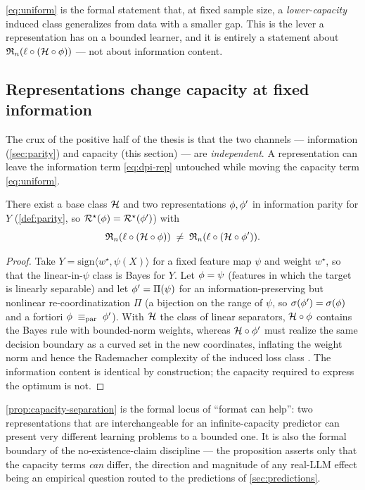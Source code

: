 \eqref{eq:uniform} is the formal statement that, at fixed sample size, a
\emph{lower-capacity} induced class generalizes from data with a smaller gap.
This is the lever a representation has on a bounded learner, and it is
entirely a statement about $\mathfrak{R}_n(\ell\circ(\mathcal{H}\circ\phi))$ --- not about
information content.

\subsection{Representations change capacity at fixed information}
\label{subsec:rep-capacity}

The crux of the positive half of the thesis is that the two channels ---
information (\cref{sec:parity}) and capacity (this section) --- are
\emph{independent}. A representation can leave the information term
\eqref{eq:dpi-rep} untouched while moving the capacity term \eqref{eq:uniform}.

\begin{proposition}
\label{prop:capacity-separation}
There exist a base class $\mathcal{H}$ and two representations $\phi,\phi'$ in
information parity for $Y$ (\cref{def:parity}, so $\mathcal{R}^{\star}(\phi) =
\mathcal{R}^{\star}(\phi')$) with
\[
  \mathfrak{R}_n(\ell\circ(\mathcal{H}\circ\phi))
  \;\ne\;
  \mathfrak{R}_n(\ell\circ(\mathcal{H}\circ\phi')).
\]
\end{proposition}

\begin{proof}
Take $Y=\mathrm{sign}\langle w^\star, \psi(X)\rangle$ for a fixed feature map
$\psi$ and weight $w^\star$, so that the linear-in-$\psi$ class is Bayes for
$Y$. Let $\phi=\psi$ (features in which the target is linearly separable) and
let $\phi'=\Pi(\psi)$ for an information-preserving but nonlinear
re-coordinatization $\Pi$ (a bijection on the range of $\psi$, so
$\sigma\!\left(\phi'\right)=\sigma\!\left(\phi\right)$ and a fortiori $\phi\;\equiv_{\mathrm{par}}\;\phi'$). With
$\mathcal{H}$ the class of linear separators, $\mathcal{H}\circ\phi$ contains the
Bayes rule with bounded-norm weights, whereas $\mathcal{H}\circ\phi'$ must
realize the same decision boundary as a curved set in the new coordinates,
inflating the weight norm and hence the Rademacher complexity of the induced
loss class \citep[Thm.~26.12]{shalevshwartz2014}. The information content is
identical by construction; the capacity required to express the optimum is
not.
\end{proof}

\cref{prop:capacity-separation} is the formal locus of ``format can help'':
two representations that are interchangeable for an infinite-capacity
predictor can present very different learning problems to a bounded one. It is
also the formal boundary of the no-existence-claim discipline --- the proposition asserts only that
the capacity terms \emph{can} differ, the direction and magnitude of any
real-LLM effect being an empirical question routed to the predictions of
\cref{sec:predictions}.

